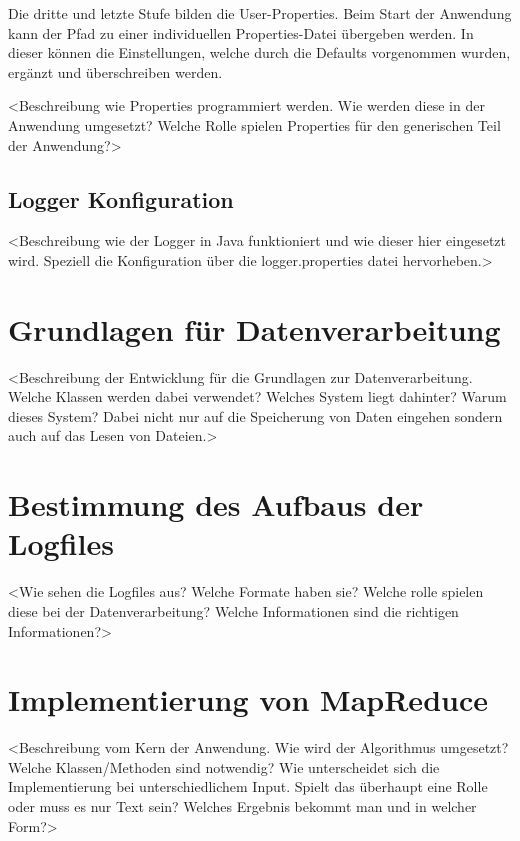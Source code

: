 Die dritte und letzte Stufe bilden die User-Properties. Beim Start der Anwendung kann der Pfad zu einer individuellen Properties-Datei übergeben werden. In dieser können die Einstellungen, welche durch die Defaults vorgenommen wurden, ergänzt und  überschreiben werden.

<Beschreibung wie Properties programmiert werden. Wie werden diese in der Anwendung umgesetzt? Welche Rolle spielen Properties für den generischen Teil der Anwendung?>

\subsection{Logger Konfiguration}
<Beschreibung wie der Logger in Java funktioniert und wie dieser hier eingesetzt wird. Speziell die Konfiguration über die logger.properties datei hervorheben.>

\section{Grundlagen für Datenverarbeitung}
<Beschreibung der Entwicklung für die Grundlagen zur Datenverarbeitung. Welche Klassen werden dabei verwendet? Welches System liegt dahinter? Warum dieses System? Dabei nicht nur auf die Speicherung von Daten eingehen sondern auch auf das Lesen von Dateien.>

\section{Bestimmung des Aufbaus der Logfiles}
<Wie sehen die Logfiles aus? Welche Formate haben sie? Welche rolle spielen diese bei der Datenverarbeitung? Welche Informationen sind die richtigen Informationen?>

\section{Implementierung von MapReduce}
<Beschreibung vom Kern der Anwendung. Wie wird der Algorithmus umgesetzt? Welche Klassen/Methoden sind notwendig? Wie unterscheidet sich die Implementierung bei unterschiedlichem Input. Spielt das überhaupt eine Rolle oder muss es nur Text sein? Welches Ergebnis bekommt man und in welcher Form?>